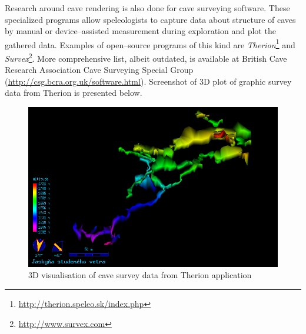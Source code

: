 Research around cave rendering is also done for cave surveying software.
These specialized programs allow speleologists to capture data about structure
of caves by manual or device--assisted measurement during exploration and plot
the gathered data. Examples of open--source programs of this kind are
\emph{Therion}\footnote{\url{http://therion.speleo.sk/index.php}} and
\emph{Survex}\footnote{\url{http://www.survex.com}}. More comprehensive list,
albeit outdated, is available at British Cave Research Association Cave Surveying
Special Group (\url{http://csg.bcra.org.uk/software.html}). Screenshot of 3D
plot of graphic survey data from Therion is presented below.
\begin{figure}[h]
  \begin{center}
    \includegraphics[width=\textwidth]{chapters/relatedwork/therion.png}
  \end{center}
  \caption{3D visualisation of cave survey data from Therion application}
  \label{fig:therion}
\end{figure}
